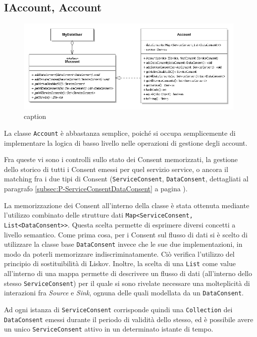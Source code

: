 \subsection{IAccount, Account}
\begin{figure} [h]
	\includegraphics[width=\linewidth]{pictures/Accounting-Account.png}
	\caption{caption}
	\label{fig:Accounting-Account}
\end{figure}
La classe \texttt{Account} \`e abbastanza semplice, poich\'e si occupa semplicemente di implementare la logica di basso livello nelle operazioni di gestione degli account.

Fra queste vi sono i controlli sullo stato dei Consent memorizzati, la gestione dello storico di tutti i Consent emessi per quel servizio service, o ancora il matching fra i due tipi di Consent (\texttt{ServiceConsent}, \texttt{DataConsent}, dettagliati al paragrafo \ref{subsec:P-ServiceConsentDataConsent} a pagina \pageref{subsec:P-ServiceConsentDataConsent}).

La memorizzazione dei Consent all’interno della classe \`e stata ottenuta mediante l’utilizzo combinato delle strutture dati \texttt{Map<ServiceConsent, List<DataConsent>>}. Questa scelta permette di esprimere diversi concetti a livello semantico. Come prima cosa, per i Consent sul flusso di dati si \`e scelto di utilizzare la classe base \texttt{DataConsent} invece che le sue due implementazioni, in modo da poterli memorizzare indiscriminatamente. Ci\`o verifica l’utilizzo del principio di sostituibilit\`a di Liskov. Inoltre, la scelta di una \texttt{List} come value all’interno di una mappa permette di descrivere un flusso di dati (all’interno dello stesso \texttt{ServiceConsent}) per il quale si sono rivelate necessare una molteplicit\`a di interazioni fra \textit{Source} e \textit{Sink}, ognuna delle quali modellata da un \texttt{DataConsent}.

Ad ogni istanza di \texttt{ServiceConsent} corrisponde quindi una \texttt{Collection} dei \texttt{DataConsent} emessi durante il periodo di validit\`a dello stesso, ed \`e possibile avere un unico \texttt{ServiceConsent} attivo in un determinato istante di tempo.

